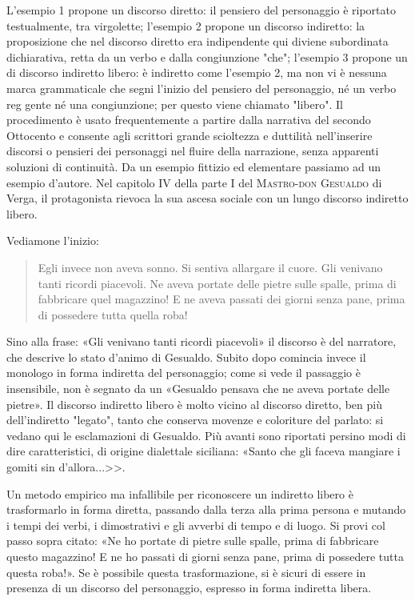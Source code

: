\documentclass{book}
\newcounter{mar}
\begin{document}
L'esempio 1 propone un discorso diretto: il pensiero del personaggio è riportato testualmente, tra virgolette; l'esempio 2 propone un discorso indiretto: la proposizione che nel discorso diretto era indipendente qui diviene subordinata dichiarativa, retta da un verbo e dalla congiunzione "che"; l'esempio 3 propone un di discorso indiretto libero: è indiretto come l'esempio 2, ma non vi è nessuna marca grammaticale che segni l'inizio del pensiero del personaggio, né un verbo reg gente né una congiunzione; per questo viene chiamato "libero". Il procedimento è usato frequentemente a partire dalla narrativa del secondo Ottocento e consente agli scrittori grande scioltezza e duttilità nell'inserire discorsi o pensieri dei personaggi nel fluire della narrazione, senza apparenti soluzioni di continuità. Da un esempio fittizio ed elementare passiamo ad un esempio d'autore. Nel capitolo IV della parte I del \textsc{Mastro-don Gesualdo} di Verga, il protagonista rievoca la sua ascesa sociale con un lungo discorso indiretto libero.

Vediamone l'inizio:

\begin{quote}
Egli invece non aveva sonno. Si sentiva allargare il cuore. Gli venivano tanti ricordi piacevoli. Ne aveva portate delle pietre sulle spalle, prima di fabbricare quel magazzino! E ne aveva passati dei giorni senza pane, prima di possedere tutta quella roba!
\end{quote}

Sino alla frase: «Gli venivano tanti ricordi piacevoli» il discorso è del narratore, che descrive lo stato d'animo di Gesualdo. Subito dopo comincia invece il monologo in forma indiretta del personaggio; come si vede il passaggio è insensibile, non è segnato da un «Gesualdo pensava che ne aveva portate delle pietre». Il discorso indiretto libero è molto vicino al discorso diretto, ben più dell'indiretto "legato", tanto che conserva movenze e coloriture del parlato: si vedano qui le esclamazioni di Gesualdo. Più avanti sono riportati persino modi di dire caratteristici, di origine dialettale siciliana: «Santo che gli faceva mangiare i gomiti sin d'allora...>>.

Un metodo empirico ma infallibile per riconoscere un indiretto libero è trasformarlo in forma diretta, passando dalla terza alla prima persona e mutando i tempi dei verbi, i dimostrativi e gli avverbi di tempo e di luogo. Si provi col passo sopra citato: «Ne ho portate di pietre sulle spalle, prima di fabbricare questo magazzino! E ne ho passati di giorni senza pane, prima di possedere tutta questa roba!». Se è possibile questa trasformazione, si è sicuri di essere in presenza di un discorso del personaggio, espresso in forma indiretta libera.
\end{document}

